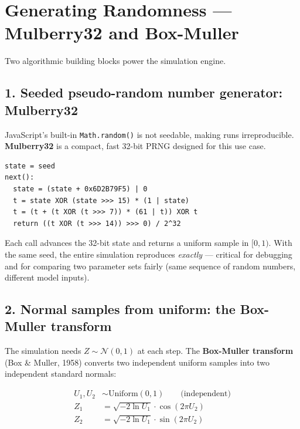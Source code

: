 \documentclass[11pt, a4paper]{article}
\newcommand{\N}{\mathcal{N}}
\begin{document}
\section{Generating Randomness — Mulberry32 and Box-Muller}
\label{sec:rng}

Two algorithmic building blocks power the simulation engine.

\subsection*{1. Seeded pseudo-random number generator: Mulberry32}

JavaScript's built-in \texttt{Math.random()} is not seedable, making runs irreproducible. \textbf{Mulberry32} is a compact, fast 32-bit PRNG designed for this use case.

\begin{tcolorbox}[mathbox]
\begin{verbatim}
state = seed
next():
  state = (state + 0x6D2B79F5) | 0
  t = state XOR (state >>> 15) * (1 | state)
  t = (t + (t XOR (t >>> 7)) * (61 | t)) XOR t
  return ((t XOR (t >>> 14)) >>> 0) / 2^32
\end{verbatim}
\end{tcolorbox}

Each call advances the 32-bit state and returns a uniform sample in $[0, 1)$. With the same seed, the entire simulation reproduces \emph{exactly} — critical for debugging and for comparing two parameter sets fairly (same sequence of random numbers, different model inputs).

\subsection*{2. Normal samples from uniform: the Box-Muller transform}

The simulation needs $Z \sim \N(0,1)$ at each step. The \textbf{Box-Muller transform} (Box \& Muller, 1958) converts two independent uniform samples into two independent standard normals:

\begin{tcolorbox}[mathbox]
\begin{align*}
  U_1, U_2 &\sim \mathrm{Uniform}(0, 1) \qquad \text{(independent)} \\[4pt]
  Z_1 &= \sqrt{-2\ln U_1} \cdot \cos(2\pi U_2) \\
  Z_2 &= \sqrt{-2\ln U_1} \cdot \sin(2\pi U_2)
\end{align*}
\end{tcolorbox}
\end{document}
